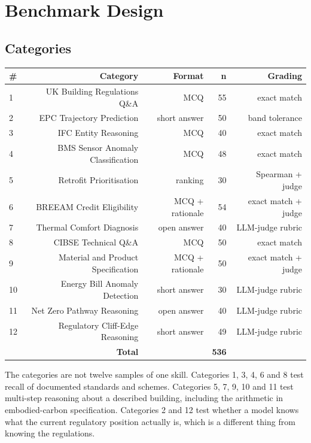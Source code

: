\documentclass[11pt,a4paper]{article}
\begin{document}
\section{Benchmark Design}

\subsection{Categories}

\begin{center}
\begin{tabular}{lrrrr}
\toprule
\# & Category & Format & n & Grading \\
\midrule
1 & UK Building Regulations Q\&A & MCQ & 55 & exact match \\
2 & EPC Trajectory Prediction & short answer & 50 & band tolerance \\
3 & IFC Entity Reasoning & MCQ & 40 & exact match \\
4 & BMS Sensor Anomaly Classification & MCQ & 48 & exact match \\
5 & Retrofit Prioritisation & ranking & 30 & Spearman + judge \\
6 & BREEAM Credit Eligibility & MCQ + rationale & 54 & exact match + judge \\
7 & Thermal Comfort Diagnosis & open answer & 40 & LLM-judge rubric \\
8 & CIBSE Technical Q\&A & MCQ & 50 & exact match \\
9 & Material and Product Specification & MCQ + rationale & 50 & exact match + judge \\
10 & Energy Bill Anomaly Detection & short answer & 30 & LLM-judge rubric \\
11 & Net Zero Pathway Reasoning & open answer & 40 & LLM-judge rubric \\
12 & Regulatory Cliff-Edge Reasoning & short answer & 49 & LLM-judge rubric \\
 & \textbf{Total} &  & \textbf{536} &  \\
\bottomrule
\end{tabular}
\end{center}

The categories are not twelve samples of one skill. Categories 1, 3, 4, 6 and 8 test recall of documented standards and schemes. Categories 5, 7, 9, 10 and 11 test multi-step reasoning about a described building, including the arithmetic in embodied-carbon specification. Categories 2 and 12 test whether a model knows what the current regulatory position actually is, which is a different thing from knowing the regulations.
\end{document}
